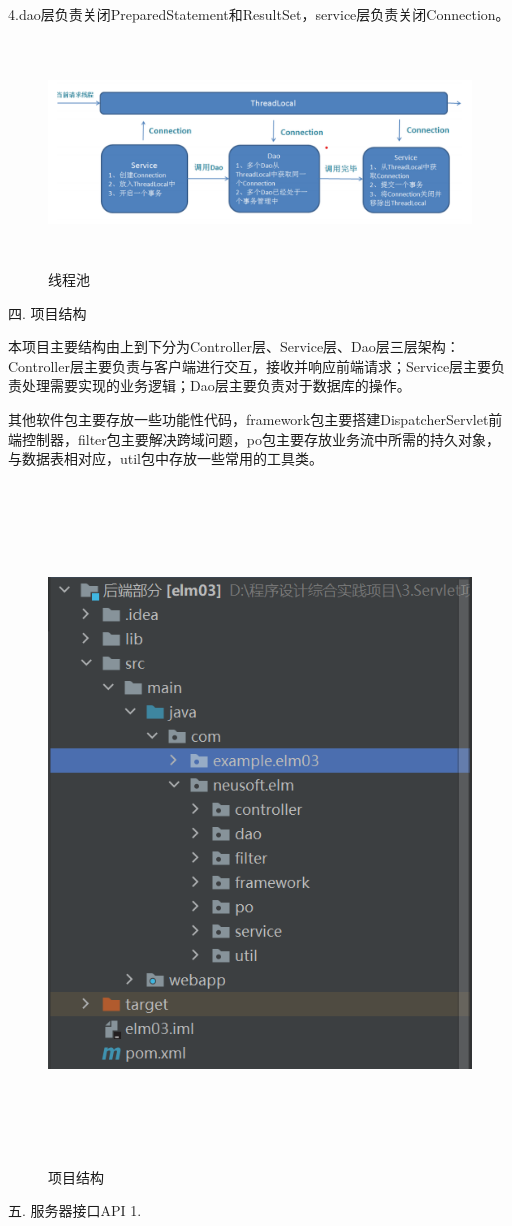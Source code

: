 4.dao层负责关闭PreparedStatement和ResultSet，service层负责关闭Connection。

\begin{figure}[H]
    \centering
    \includegraphics[width=15cm,height=6cm]{figures/thread.png}
    \caption{线程池}
\end{figure}

\noindent
四. 项目结构

本项目主要结构由上到下分为Controller层、Service层、Dao层三层架构：Controller层主要负责与客户端进行交互，接收并响应前端请求；Service层主要负责处理需要实现的业务逻辑；Dao层主要负责对于数据库的操作。

其他软件包主要存放一些功能性代码，framework包主要搭建DispatcherServlet前端控制器，filter包主要解决跨域问题，po包主要存放业务流中所需的持久对象，与数据表相对应，util包中存放一些常用的工具类。

\begin{figure}[H]
    \centering
    \includegraphics[width=15cm,height=18cm]{figures/structure3.png}
    \caption{项目结构}
\end{figure}

\noindent
五. 服务器接口API
1.



